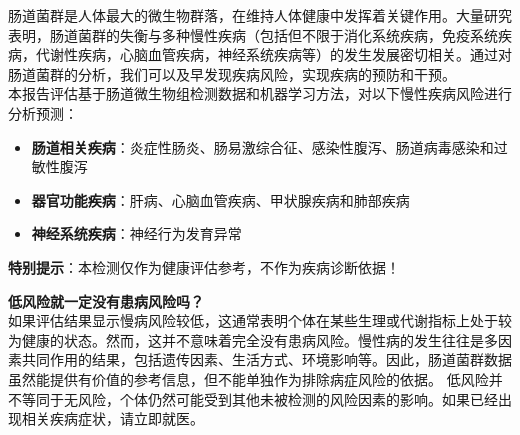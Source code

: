 \documentclass[UTF8]{ctexart}
\begin{document}
\begin{tcolorbox}[
    enhanced,
    colback=customTealBg,
    colframe=gray!5,
    arc=3mm,
    boxrule=0pt,
    width=\textwidth,
    top=8pt,
    bottom=8pt
]
{\small{\color{customTeal}\faInfoCircle}
肠道菌群是人体最大的微生物群落，在维持人体健康中发挥着关键作用。大量研究表明，肠道菌群的失衡与多种慢性疾病（包括但不限于消化系统疾病，免疫系统疾病，代谢性疾病，心脑血管疾病，神经系统疾病等）的发生发展密切相关。通过对肠道菌群的分析，我们可以及早发现疾病风险，实现疾病的预防和干预。\\

本报告评估基于肠道微生物组检测数据和机器学习方法，对以下慢性疾病风险进行分析预测：
\begin{itemize}
    \item \textbf{肠道相关疾病}：炎症性肠炎、肠易激综合征、感染性腹泻、肠道病毒感染和过敏性腹泻
    \item \textbf{器官功能疾病}：肝病、心脑血管疾病、甲状腺疾病和肺部疾病
    \item \textbf{神经系统疾病}：神经行为发育异常
\end{itemize}


{\color{orange}\faExclamationTriangle} \textbf{特别提示}：本检测仅作为健康评估参考，不作为疾病诊断依据！}
\end{tcolorbox}

\begin{tcolorbox}[
    enhanced,
    colback=lightpurple!10, %
    colframe=lightpurple!10,  %
    arc=3mm,
    boxrule=0.5pt,
    width=\textwidth,
    top=8pt,
    bottom=8pt
]
{\small{\color{lightpurple}\faQuestionCircle}\quad \textbf{低风险就一定没有患病风险吗？}\\
{\color{orange!50}\faComments}\quad 如果评估结果显示慢病风险较低，这通常表明个体在某些生理或代谢指标上处于较为健康的状态。然而，这并不意味着完全没有患病风险。慢性病的发生往往是多因素共同作用的结果，包括遗传因素、生活方式、环境影响等。因此，肠道菌群数据虽然能提供有价值的参考信息，但不能单独作为排除病症风险的依据。
低风险并不等同于无风险，个体仍然可能受到其他未被检测的风险因素的影响。如果已经出现相关疾病症状，请立即就医。
}
\end{tcolorbox}
\end{document}

